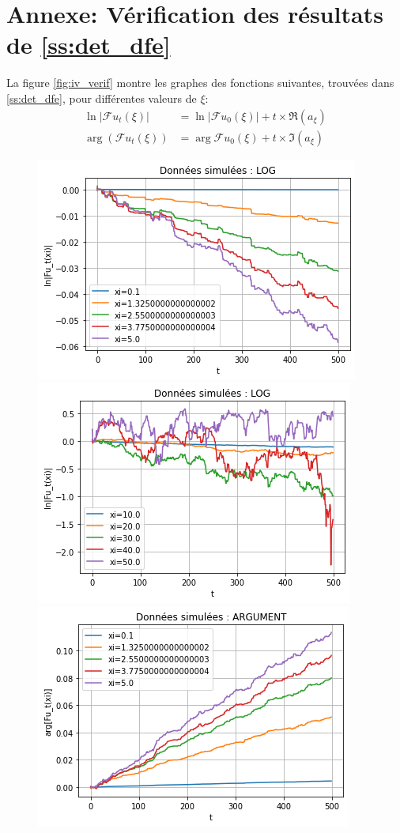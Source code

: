 \documentclass[12pt]{article}
\newcommand{\pth}[1]{\left(#1\right)}
\newcommand{\abs}[1]{\left|#1\right|}
\newcommand{\fr}{\mathcal{F}}
\begin{document}
\section{Annexe: Vérification des résultats de \ref{ss:det_dfe}\label{ann:verif}}

La figure \ref{fig:iv_verif} montre les graphes des fonctions suivantes, trouvées dans \ref{ss:det_dfe}, pour différentes valeurs de $\xi$:
\begin{align*}
  \ln\abs{\fr u_t(\xi)}&=\ln\abs{\fr u_0(\xi)}+t\times\Re(a_{\xi})\\
  \arg\pth{\fr u_t(\xi)}&=\arg{\fr u_0(\xi)}+t\times\Im(a_{\xi})
\end{align*}

\begin{figure}[h]
  \begin{center}
    \includegraphics[scale=0.6]{img/iv_verif_pxi.png}
    \includegraphics[scale=0.6]{img/iv_verif_grxi.png}
    \includegraphics[scale=0.6]{img/iv_verif_pxi_im.png}

\end{center}
\end{figure}
\end{document}
